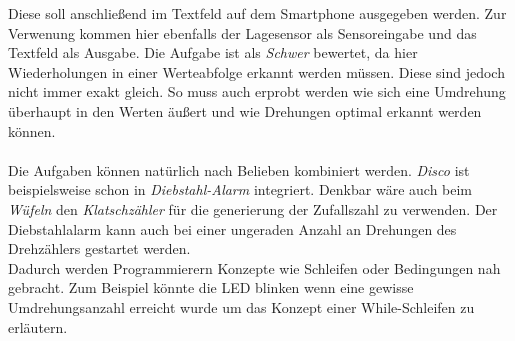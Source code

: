 \documentclass[11pt,a4paper]{report}
\begin{document}
Diese soll anschließend im Textfeld auf dem Smartphone ausgegeben werden.
Zur Verwenung kommen hier ebenfalls der Lagesensor als Sensoreingabe und das Textfeld als Ausgabe.
Die Aufgabe ist als \textit{Schwer} bewertet, da hier Wiederholungen in einer Werteabfolge erkannt werden müssen.
Diese sind jedoch nicht immer exakt gleich.
So muss auch erprobt werden wie sich eine Umdrehung überhaupt in den Werten äußert und wie Drehungen optimal erkannt werden können.
\\\\
Die Aufgaben können natürlich nach Belieben kombiniert werden.
\textit{Disco} ist beispielsweise schon in \textit{Diebstahl-Alarm} integriert.
Denkbar wäre auch beim \textit{Wüfeln} den \textit{Klatschzähler} für die generierung der Zufallszahl zu verwenden.
Der Diebstahlalarm kann auch bei einer ungeraden Anzahl an Drehungen des Drehzählers gestartet werden.
\\
Dadurch werden Programmierern Konzepte wie Schleifen oder Bedingungen nah gebracht.
Zum Beispiel könnte die LED blinken wenn eine gewisse Umdrehungsanzahl erreicht wurde um das Konzept einer While-Schleifen zu erläutern.
\end{document}

